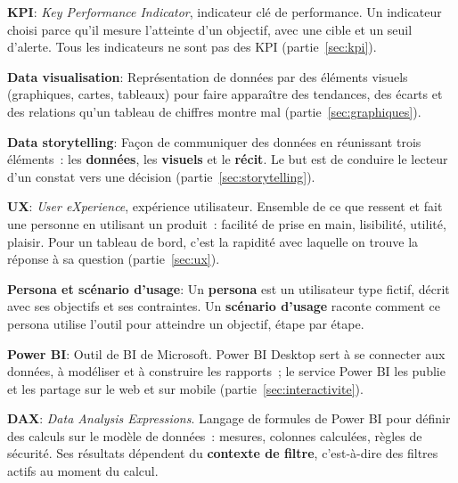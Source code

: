 \separateur

\noindent \textbf{KPI}:
\noindent \textit{Key Performance Indicator}, indicateur clé de performance. Un indicateur choisi parce qu'il mesure l'atteinte d'un objectif, avec une cible et un seuil d'alerte. Tous les indicateurs ne sont pas des KPI (partie~\ref{sec:kpi}).

\separateur

\noindent \textbf{Data visualisation}:
\noindent Représentation de données par des éléments visuels (graphiques, cartes, tableaux) pour faire apparaître des tendances, des écarts et des relations qu'un tableau de chiffres montre mal (partie~\ref{sec:graphiques}).

\separateur

\noindent \textbf{Data storytelling}:
\noindent Façon de communiquer des données en réunissant trois éléments~: les \textbf{données}, les \textbf{visuels} et le \textbf{récit}. Le but est de conduire le lecteur d'un constat vers une décision (partie~\ref{sec:storytelling}).

\separateur

\noindent \textbf{UX}:
\noindent \textit{User eXperience}, expérience utilisateur. Ensemble de ce que ressent et fait une personne en utilisant un produit~: facilité de prise en main, lisibilité, utilité, plaisir. Pour un tableau de bord, c'est la rapidité avec laquelle on trouve la réponse à sa question (partie~\ref{sec:ux}).

\separateur

\noindent \textbf{Persona et scénario d'usage}:
\noindent Un \textbf{persona} est un utilisateur type fictif, décrit avec ses objectifs et ses contraintes. Un \textbf{scénario d'usage} raconte comment ce persona utilise l'outil pour atteindre un objectif, étape par étape.

\separateur

\noindent \textbf{Power BI}:
\noindent Outil de BI de Microsoft. Power BI Desktop sert à se connecter aux données, à modéliser et à construire les rapports~; le service Power BI les publie et les partage sur le web et sur mobile (partie~\ref{sec:interactivite}).

\separateur

\noindent \textbf{DAX}:
\noindent \textit{Data Analysis Expressions}. Langage de formules de Power BI pour définir des calculs sur le modèle de données~: mesures, colonnes calculées, règles de sécurité. Ses résultats dépendent du \textbf{contexte de filtre}, c'est-à-dire des filtres actifs au moment du calcul.


